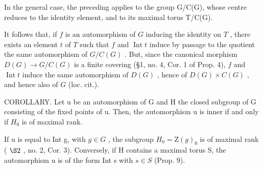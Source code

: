 In the general case, the preceding applies to the group G/C(G), whose centre reduces to the identity element, and to its maximal torus T/C(G).

It follows that, if \(f\) is an automorphism of \(G\) inducing the identity on \(T\) , there exists an element \(t\) of \(T\) such that \(f\) and \(\operatorname{Int} t\) induce by passage to the quotient the same automorphism of \(G / C(G)\) . But, since the canonical morphism \(D(G) \to G / C(G)\) is a finite covering (§1, no. 4, Cor. 1 of Prop. 4), \(f\) and \(\operatorname{Int} t\) induce the same automorphism of \(D(G)\) , hence of \(D(G) \times C(G)\) , and hence also of \(G\) (loc. cit.).

COROLLARY. Let u be an automorphism of G and H the closed subgroup of G consisting of the fixed points of u. Then, the automorphism u is inner if and only if \(H_{0}\) is of maximal rank.

If u is equal to Int g, with \(g \in G\) , the subgroup \(H_{0} = \mathrm{Z}(g)_{0}\) is of maximal rank ( \(\S2\) , no. 2, Cor. 3). Conversely, if H contains a maximal torus S, the automorphism u is of the form Int s with \(s \in S\) (Prop. 9).
\relax{}
